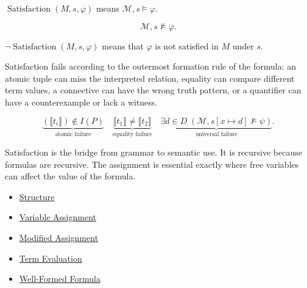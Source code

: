 \begin{remark*}
\(\operatorname{Satisfaction}(M,s,\varphi)\) means
\(\mathcal M,s\models\varphi\).
\end{remark*}

\begin{remark*}
\[
\mathcal M,s\not\models\varphi.
\]
\end{remark*}

\begin{remark*}
\(\neg\operatorname{Satisfaction}(M,s,\varphi)\) means that \(\varphi\) is not
satisfied in \(M\) under \(s\).
\end{remark*}

\begin{remark*}
Satisfaction fails according to the outermost formation rule of the formula:
an atomic tuple can miss the interpreted relation, equality can compare
different term values, a connective can have the wrong truth pattern, or a
quantifier can have a counterexample or lack a witness.
\end{remark*}

\begin{remark*}
\[
\underbrace{(\llbracket t_i\rrbracket)\notin I(P)}_{\text{atomic failure}}
\quad
\underbrace{\llbracket t_1\rrbracket\neq\llbracket t_2\rrbracket}_{\text{equality failure}}
\quad
\underbrace{\exists d\in D\;(\mathcal M,s[x\mapsto d]\not\models\psi)}_{\text{universal failure}}.
\]
\end{remark*}

\begin{remark*}[Interpretation]
Satisfaction is the bridge from grammar to semantic use. It is recursive
because formulas are recursive. The assignment is essential exactly where free
variables can affect the value of the formula.
\end{remark*}

\begin{dependencies}
\begin{itemize}
  \item \hyperref[def:structure]{Structure}
  \item \hyperref[def:var-assign]{Variable Assignment}
  \item \hyperref[def:mod-assign]{Modified Assignment}
  \item \hyperref[def:term-interp]{Term Evaluation}
  \item \hyperref[def:wff-pred]{Well-Formed Formula}
\end{itemize}
\end{dependencies}

